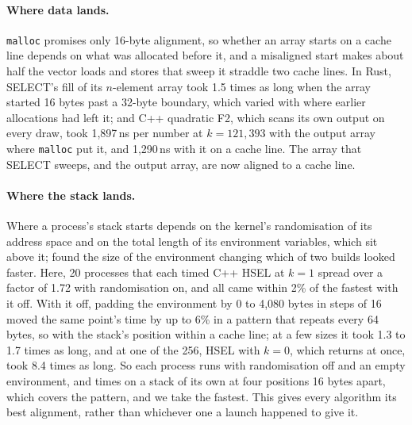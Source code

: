 \documentclass[letterpaper,11pt]{article}
\begin{document}
\paragraph{Where data lands.} \texttt{malloc} promises only
16-byte alignment, so whether an array starts on a cache line depends on
what was allocated before it, and a misaligned start makes about half
the vector loads and stores that sweep it straddle two cache lines. In
Rust, SELECT's fill of its \(n\)-element array took 1.5 times as long
when the array started 16 bytes past a 32-byte boundary, which varied
with where earlier allocations had left it; and C++ quadratic F2, which
scans its own output on every draw, took 1,897\,ns per number at
\(k = 121{,}393\) with the output array where \texttt{malloc}
put it, and 1,290\,ns with it on a cache line. The array that SELECT
sweeps, and the output array, are now aligned to a cache line.

\paragraph{Where the stack lands.} Where a process's stack starts
depends on the kernel's randomisation of its address space and on the
total length of its environment variables, which sit above it;
\textcite{mytkowicz} found the size of the environment changing which
of two builds looked faster. Here, 20 processes that each timed C++ HSEL
at \(k = 1\) spread over a factor of 1.72 with randomisation on, and
all came within 2\% of the fastest with it off. With it off, padding
the environment by 0 to 4,080 bytes in steps of 16 moved the same
point's time by up to 6\% in a pattern that repeats every 64 bytes, so
with the stack's position within a cache line; at a few sizes it took
1.3 to 1.7 times as long, and at one of the 256, HSEL with \(k = 0\),
which returns at once, took 8.4 times as long. So each process runs with randomisation
off and an empty environment, and times on a stack of its own at four
positions 16 bytes apart, which covers the pattern, and we take the
fastest. This gives every algorithm its best alignment, rather than
whichever one a launch happened to give it.
\end{document}
